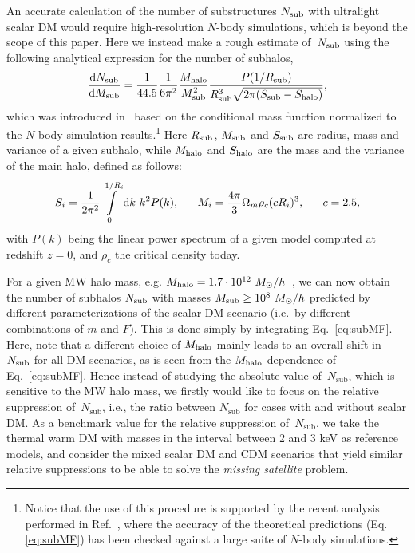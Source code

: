 \documentclass[11pt,nofootinbib]{article}
\numberwithin{equation}{section}
\begin{document}
An accurate calculation of the number of substructures $N_{\rm sub}$
with ultralight scalar DM would require high-resolution $N$-body
simulations, which is beyond the scope of this paper.
Here we instead make a rough estimate of~$N_{\rm sub}$ using the
following analytical expression for the number of subhalos,
\begin{equation}\label{eq:subMF}
 \frac{{\rm d}N_{\rm sub}}{{\rm d}M_{\rm sub}} = \frac{1}{44.5}\frac{1}{6\pi^2}\frac{M_{\rm halo}}
 {M^2_{\rm sub}}\frac{P(1/R_{\rm sub})}{R^3_{\rm sub}\sqrt{2\pi(S_{\rm sub}-S_{\rm halo})}},
\end{equation}
which was introduced in~\cite{Schneider:2014rda,Schneider:2016uqi}
based on the conditional mass function normalized to the
$N$-body simulation results.\footnote{Notice that the use of this
procedure is supported by the recent analysis performed in
Ref.~\cite{Murgia:2017lwo}, where the accuracy of the theoretical
predictions (Eq.\eqref{eq:subMF}) has been checked against a large suite
of $N$-body simulations.}  
Here $R_{\rm sub}$, $M_{\rm sub}$ and $S_{\rm sub}$ are radius, mass and variance of a given subhalo, while $M_{\rm halo}$ and $S_{\rm halo}$ are the mass and the variance of the main halo, defined as follows:
\begin{equation}\label{eq:mass_var}
 S_i = \frac{1}{2\pi^2} \int\limits_0^{1/R_i} {\rm d}k\ k^2P(k), ~~~~~ M_i = \frac{4\pi}{3}\Omega_m\rho_c(cR_i)^3, ~~~~~ c=2.5,
\end{equation}
with $P(k)$ being the linear power spectrum of a given model computed at
redshift $z=0$, and $\rho_c$ the critical density today.

For a given MW halo mass, e.g. $M_{\rm halo} = 1.7 \cdot
10^{12}~M_\odot/h$~\cite{Lovell:2013ola}, we can now obtain the number
of subhalos $N_{\rm sub}$ with masses $M_{\rm sub} \geq 10^8~M_\odot/h$
predicted by different parameterizations of
the scalar DM scenario (i.e.~by different combinations of $m$ and
$F$). This is done simply by integrating Eq.~\eqref{eq:subMF}. 
Here, note that a different choice of $M_{\rm halo}$ mainly leads to an
overall shift in $N_{\rm sub}$ for all DM scenarios,
as is seen from the $M_{\rm halo}$-dependence of Eq.~\eqref{eq:subMF}.
Hence instead of studying the absolute value of~$N_{\mathrm{sub}}$, which
is sensitive to the MW halo mass,
we firstly would like to focus on the relative suppression
of~$N_{\mathrm{sub}}$,
i.e., the ratio between $N_{\mathrm{sub}}$ for cases with and without
scalar DM. 
As a benchmark value for the relative suppression of~$N_{\mathrm{sub}}$, 
we take the thermal warm DM with masses in
the interval between 2 and 3 keV as reference models, 
and consider the mixed scalar DM and CDM scenarios
that yield similar relative suppressions
to be able to solve the {\emph{missing satellite}} problem.
\end{document}
